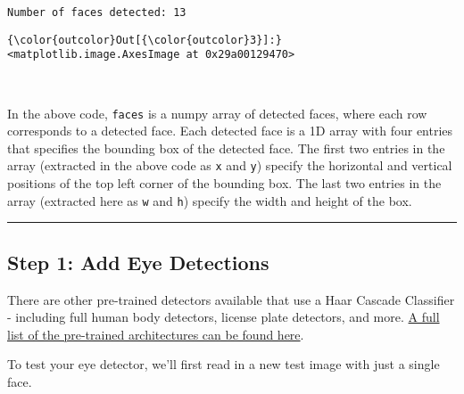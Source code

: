 \documentclass[11pt]{article}
\begin{document}
    \begin{Verbatim}[commandchars=\\\{\}]
Number of faces detected: 13

    \end{Verbatim}

\begin{Verbatim}[commandchars=\\\{\}]
{\color{outcolor}Out[{\color{outcolor}3}]:} <matplotlib.image.AxesImage at 0x29a00129470>
\end{Verbatim}
            
    \begin{center}
    \end{center}
    { \hspace*{\fill} \\}
    
    In the above code, \texttt{faces} is a numpy array of detected faces,
where each row corresponds to a detected face. Each detected face is a
1D array with four entries that specifies the bounding box of the
detected face. The first two entries in the array (extracted in the
above code as \texttt{x} and \texttt{y}) specify the horizontal and
vertical positions of the top left corner of the bounding box. The last
two entries in the array (extracted here as \texttt{w} and \texttt{h})
specify the width and height of the box.

    \begin{center}\rule{0.5\linewidth}{\linethickness}\end{center}

\subsection{Step 1: Add Eye Detections}\label{step-1-add-eye-detections}

There are other pre-trained detectors available that use a Haar Cascade
Classifier - including full human body detectors, license plate
detectors, and more.
\href{https://github.com/opencv/opencv/tree/master/data/haarcascades}{A
full list of the pre-trained architectures can be found here}.

    To test your eye detector, we'll first read in a new test image with
just a single face.
\end{document}
